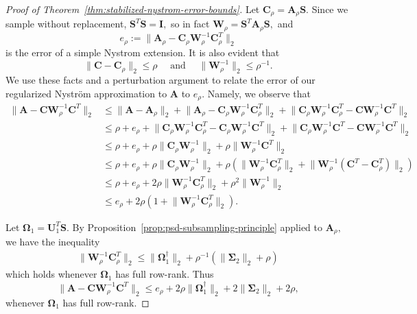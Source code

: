 \documentclass[11pt,letterpaper,twoside,reqno,nosumlimits]{amsart}
\def\pinv{\dagger}
\def\transp{T}
\newcommand{\mat}[1]{\ensuremath{\mathbf{#1}}}
\newcommand{\snorm}[1]{\ensuremath{\big\|#1\big\|_2}}
\theoremstyle{remark}
\begin{document}
\begin{proof}[Proof of Theorem~\ref{thm:stabilized-nystrom-error-bounds}]
 Let $\mat{C}_\rho = \mat{A}_\rho \mat{S}.$ Since we sample without replacement, $\mat{S}^\transp \mat{S} = \mat{I},$ so in fact $\mat{W}_\rho = \mat{S}^\transp\mat{A}_\rho\mat{S},$ and
\[
 e_\rho := \snorm{\mat{A}_\rho - \mat{C}_\rho \mat{W}_\rho^{-1} \mat{C}_\rho^\transp}
\]
is the error of a simple Nystrom extension. It is also evident that 
\[ \snorm{\mat{C} - \mat{C}_\rho} \leq \rho \quad \text{ and } \quad \snorm{\mat{W}_\rho^{-1}} \leq \rho^{-1}. 
\]
We use these facts and a perturbation argument to relate the error of our regularized Nystr\"om approximation to $\mat{A}$ to $e_\rho.$ Namely, we observe that	
\[
\begin{aligned}
\snorm{\mat{A} - \mat{C}\mat{W}_\rho^{-1} \mat{C}^\transp } & \leq \snorm{\mat{A} - \mat{A}_\rho} + \snorm{\mat{A}_\rho - \mat{C}_\rho \mat{W}_\rho^{-1} \mat{C}_\rho^\transp} + \snorm{\mat{C}_\rho \mat{W}_\rho^{-1} \mat{C}_\rho^\transp - \mat{C} \mat{W}_\rho^{-1} \mat{C}^\transp} \\
& \leq \rho + e_\rho + \snorm{\mat{C}_\rho \mat{W}_\rho^{-1} \mat{C}_\rho^\transp - \mat{C}_\rho \mat{W}_\rho^{-1} \mat{C}^\transp} + \snorm{\mat{C}_\rho \mat{W}_\rho^{-1} \mat{C}^\transp - \mat{C} \mat{W}_\rho^{-1} \mat{C}^\transp} \\
& \leq \rho + e_\rho + \rho \snorm{\mat{C}_\rho \mat{W}_\rho^{-1}} + \rho \snorm{\mat{W}_\rho^{-1} \mat{C}^\transp} \\
& \leq \rho + e_\rho + \rho \snorm{\mat{C}_\rho \mat{W}_\rho^{-1}} + \rho ( \snorm{\mat{W}_\rho^{-1} \mat{C}_\rho^\transp} + \snorm{\mat{W}_\rho^{-1} (\mat{C}^\transp - \mat{C}_\rho^\transp)}) \\
& \leq \rho + e_\rho + 2 \rho\snorm{\mat{W}_\rho^{-1} \mat{C}_\rho^\transp} + \rho^2 \snorm{\mat{W}_\rho^{-1}} \\
& \leq e_\rho + 2 \rho (1 + \snorm{\mat{W}_\rho^{-1} \mat{C}_\rho^\transp}).
\end{aligned}
\]

 Let $\mat{\Omega}_1 = \mat{U}_1^\transp \mat{S}.$ By Proposition~\ref{prop:psd-subsampling-principle} applied to $\mat{A}_\rho,$ we have the inequality
\[
\begin{aligned}
 \snorm{\mat{W}_\rho^{-1} \mat{C}_\rho^\transp} \leq \snorm{\mat{\Omega}_1^\pinv} + \rho^{-1} (\snorm{\mat{\Sigma}_2} + \rho)
\end{aligned}
\]
which holds whenever $\mat{\Omega}_1$ has full row-rank. Thus 
\begin{equation}
 \label{eqn:perturbation-bound}
\snorm{\mat{A} - \mat{C}\mat{W}_\rho^{-1} \mat{C}^\transp } \leq e_\rho + 2\rho \snorm{\mat{\Omega}_1^\pinv}  + 2 \snorm{\mat{\Sigma}_2} + 2\rho,
 \end{equation}
whenever $\mat{\Omega}_1$ has full row-rank.


\end{proof}
\end{document}
